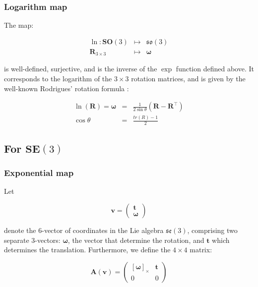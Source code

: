 \documentclass[a4paper,11pt]{report}
\newcommand{\W}{{\bm{\omega}}}
\begin{document}
\subsubsection{Logarithm map}

The map:

\begin{eqnarray}
  \ln: \mathbf{SO}(3) & \mapsto & \mathfrak{so}(3)   \\
           \mathbf{R}_{3\times 3} & \mapsto &  \W
\end{eqnarray}

\noindent is well-defined, surjective, and is the inverse of the $\exp$ function defined above. 
It corresponds to the logarithm of the $3\times 3$ rotation matrices, and is given by the
well-known Rodrigues' rotation formula \cite{altafini2000cas}:


\begin{eqnarray}
\label{eq:rodrigues_ln}
 \ln(\mathbf{R}) = \W &=& \frac{1}{2\sin \theta} \left( \mathbf{R} - \mathbf{R}^\top
\right)
\\
\cos \theta &=& \frac{tr(R)-1}{2}  \nonumber
\end{eqnarray}


\subsection{For $\mathbf{SE}(3)$}

\subsubsection{Exponential map}
\label{sect:se3_exp}

Let 

\begin{equation}
\label{eq:vector_in_se3}
\mathbf{v}= \left( \begin{array}{c} \mathbf{t} \\ \W \end{array} \right)
\end{equation}

\noindent denote the 6-vector of coordinates in 
the Lie algebra $\mathfrak{se}(3)$, 
comprising
two separate 3-vectors: $\W$, the vector that determine 
the rotation, and $\mathbf{t}$ which determines the translation.
Furthermore, we define the $4 \times 4$ matrix:

\begin{equation}
 \mathbf{A}(\mathbf{v})=
\left( 
\begin{array}{cc}
 [\W]_\times  & \mathbf{t} \\
 0 & 0
\end{array}
\right)
\end{equation}
\end{document}
